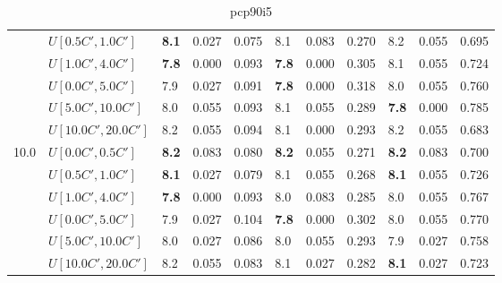 \begin{table}[h]
{\begin{tabular}{|l|l||l|l|l||l|l|l||l|l|l|}
       & $U[0.5C',1.0C']$ & \textbf{8.1} & 0.027 & 0.075 & 8.1 & 0.083 & 0.270 & 8.2 & 0.055 & 0.695 \\
       & $U[1.0C',4.0C']$ & \textbf{7.8} & 0.000 & 0.093 & \textbf{7.8} & 0.000 & 0.305 & 8.1 & 0.055 & 0.724 \\
       & $U[0.0C',5.0C']$ & 7.9 & 0.027 & 0.091 & \textbf{7.8} & 0.000 & 0.318 & 8.0 & 0.055 & 0.760 \\
       & $U[5.0C',10.0C']$ & 8.0 & 0.055 & 0.093 & 8.1 & 0.055 & 0.289 & \textbf{7.8} & 0.000 & 0.785 \\
       & $U[10.0C',20.0C']$ & 8.2 & 0.055 & 0.094 & 8.1 & 0.000 & 0.293 & 8.2 & 0.055 & 0.683 \\
      \hline\hline
      \multirow{6}{*}{10.0} & $U[0.0C',0.5C']$ & \textbf{8.2} & 0.083 & 0.080 & \textbf{8.2} & 0.055 & 0.271 & \textbf{8.2} & 0.083 & 0.700 \\
       & $U[0.5C',1.0C']$ & \textbf{8.1} & 0.027 & 0.079 & 8.1 & 0.055 & 0.268 & \textbf{8.1} & 0.055 & 0.726 \\
       & $U[1.0C',4.0C']$ & \textbf{7.8} & 0.000 & 0.093 & 8.0 & 0.083 & 0.285 & 8.0 & 0.055 & 0.767 \\
       & $U[0.0C',5.0C']$ & 7.9 & 0.027 & 0.104 & \textbf{7.8} & 0.000 & 0.302 & 8.0 & 0.055 & 0.770 \\
       & $U[5.0C',10.0C']$ & 8.0 & 0.027 & 0.086 & 8.0 & 0.055 & 0.293 & 7.9 & 0.027 & 0.758 \\
       & $U[10.0C',20.0C']$ & 8.2 & 0.055 & 0.083 & 8.1 & 0.027 & 0.282 & \textbf{8.1} & 0.027 & 0.723 \\
      \hline
      \end{tabular}
      }
      \caption{pcp90i5}
      \label{tab:pcpn90RecoloredTT}\end{table}
 

